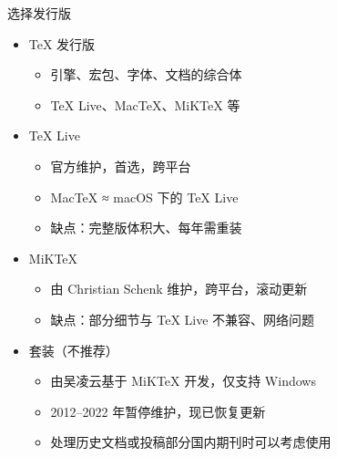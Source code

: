 \begin{frame}{选择发行版}
\begin{itemize}
  \item \TeX{} 发行版

    \begin{itemize}
      \item 引擎、宏包、字体、文档的综合体
      \item \TeX{} Live、Mac\TeX{}、MiK\TeX{} 等
    \end{itemize} \pause

  \item \TeX{} Live 

    \begin{itemize}
      \item 官方维护，首选，跨平台
      \item Mac\TeX{} ≈ macOS 下的 \TeX{} Live
      \item 缺点：完整版体积大、每年需重装
    \end{itemize}

  \item MiK\TeX{} 

    \begin{itemize}
      \item 由 Christian Schenk 维护，跨平台，滚动更新
      \item 缺点：部分细节与 \TeX{} Live 不兼容、网络问题
    \end{itemize} \pause

  \item \CTeX{} 套装（不推荐） 

    \begin{itemize}
      \item 由吴凌云基于 MiK\TeX{} 开发，仅支持 Windows
      \item 2012--2022 年暂停维护，现已恢复更新
      \item 处理历史文档或投稿部分国内期刊时可以考虑使用
    \end{itemize}
\end{itemize}
\end{frame}

